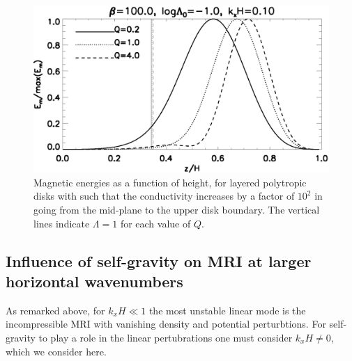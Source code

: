 \begin{figure}
  \includegraphics[width=\linewidth]{figures/compare_results_poly_layer_amp100}
  \caption{Magnetic energies as a function of height, for layered polytropic disks with
    such that the conductivity increases by a 
    factor of $10^2$ in going from the mid-plane to the upper disk
    boundary. The vertical lines indicate $\Lambda=1$ for each value
    of $Q$.
    \label{poly_layer}}
\end{figure}




\subsection{Influence of self-gravity on MRI at larger horizontal
  wavenumbers} 
As remarked above, for $k_xH\ll 1$ the most unstable linear mode is
the incompressible MRI with vanishing density and potential
perturbtions. For self-gravity to play a role in the linear
pertubrations one must consider $k_xH \neq 0$, which we consider
here. 









